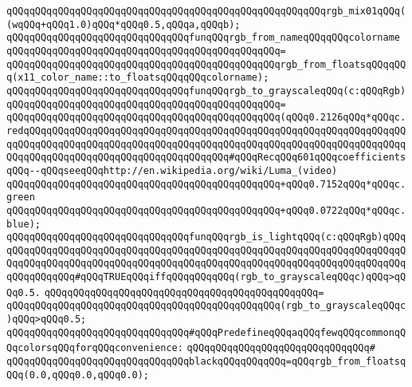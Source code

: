 \verb|qQQqqQQqqQQqqQQqqQQqqQQqqQQqqQQqqQQqqQQqqQQqqQQqqQQqqQQqrgb_mix01qQQq((wqQQq+qQQq1.0)qQQq*qQQq0.5,qQQqa,qQQqb);|\newline
\newline
\verb|qQQqqQQqqQQqqQQqqQQqqQQqqQQqqQQqfunqQQqrgb_from_nameqQQqqQQqcolorname|\newline
\verb|qQQqqQQqqQQqqQQqqQQqqQQqqQQqqQQqqQQqqQQqqQQqqQQq=|\newline
\verb|qQQqqQQqqQQqqQQqqQQqqQQqqQQqqQQqqQQqqQQqqQQqqQQqrgb_from_floatsqQQqqQQq(x11_color_name::to_floatsqQQqqQQqcolorname);|\newline
\newline
\verb|qQQqqQQqqQQqqQQqqQQqqQQqqQQqqQQqfunqQQqrgb_to_grayscaleqQQq(c:qQQqRgb)|\newline
\verb|qQQqqQQqqQQqqQQqqQQqqQQqqQQqqQQqqQQqqQQqqQQqqQQq=|\newline
\verb|qQQqqQQqqQQqqQQqqQQqqQQqqQQqqQQqqQQqqQQqqQQqqQQq(qQQq0.2126qQQq*qQQqc.redqQQqqQQqqQQqqQQqqQQqqQQqqQQqqQQqqQQqqQQqqQQqqQQqqQQqqQQqqQQqqQQqqQQqqQQqqQQqqQQqqQQqqQQqqQQqqQQqqQQqqQQqqQQqqQQqqQQqqQQqqQQqqQQqqQQqqQQqqQQqqQQqqQQqqQQqqQQqqQQqqQQqqQQqqQQqqQQq#qQQqRecqQQq601qQQqcoefficientsqQQq--qQQqseeqQQqhttp://en.wikipedia.org/wiki/Luma_(video)|\newline
\verb|qQQqqQQqqQQqqQQqqQQqqQQqqQQqqQQqqQQqqQQqqQQqqQQq+qQQq0.7152qQQq*qQQqc.green|\newline
\verb|qQQqqQQqqQQqqQQqqQQqqQQqqQQqqQQqqQQqqQQqqQQqqQQq+qQQq0.0722qQQq*qQQqc.blue);|\newline
\newline
\verb|qQQqqQQqqQQqqQQqqQQqqQQqqQQqqQQqfunqQQqrgb_is_lightqQQq(c:qQQqRgb)qQQqqQQqqQQqqQQqqQQqqQQqqQQqqQQqqQQqqQQqqQQqqQQqqQQqqQQqqQQqqQQqqQQqqQQqqQQqqQQqqQQqqQQqqQQqqQQqqQQqqQQqqQQqqQQqqQQqqQQqqQQqqQQqqQQqqQQqqQQqqQQqqQQqqQQqqQQq#qQQqTRUEqQQqiffqQQqqQQqqQQq(rgb_to_grayscaleqQQqc)qQQq>qQQq0.5.|\newline
\verb|qQQqqQQqqQQqqQQqqQQqqQQqqQQqqQQqqQQqqQQqqQQqqQQq=|\newline
\verb|qQQqqQQqqQQqqQQqqQQqqQQqqQQqqQQqqQQqqQQqqQQqqQQq(rgb_to_grayscaleqQQqc)qQQq>qQQq0.5;|\newline
\newline
\newline
\newline
\verb|qQQqqQQqqQQqqQQqqQQqqQQqqQQqqQQq#qQQqPredefineqQQqaqQQqfewqQQqcommonqQQqcolorsqQQqforqQQqconvenience:|\newline
\verb|qQQqqQQqqQQqqQQqqQQqqQQqqQQqqQQq#|\newline
\verb|qQQqqQQqqQQqqQQqqQQqqQQqqQQqqQQqblackqQQqqQQqqQQq=qQQqrgb_from_floatsqQQq(0.0,qQQq0.0,qQQq0.0);|\newline
